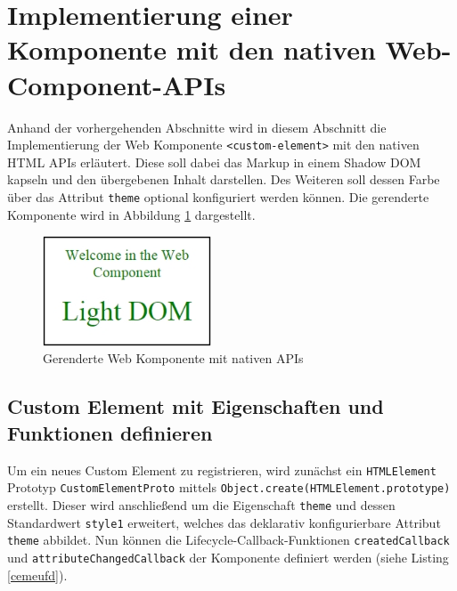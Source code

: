 \section{Implementierung einer Komponente mit den nativen Web-Component-APIs}\label{implementierung-einer-komponente-mit-den-nativen-web-component-apis}

Anhand der vorhergehenden Abschnitte wird in diesem Abschnitt die Implementierung der Web Komponente \texttt{\textless{}custom-element\textgreater{}} mit den nativen \ac{HTML} APIs erläutert. Diese soll dabei das Markup in einem Shadow \ac{DOM} kapseln und den übergebenen Inhalt darstellen. Des Weiteren soll dessen Farbe über das Attribut \texttt{theme} optional konfiguriert werden können. Die gerenderte Komponente wird in Abbildung \ref{fig:gwkmnapis} dargestellt.

\begin{figure}[htbp]
 \centering
 \includegraphics[width=5cm,keepaspectratio]{kapitel2/bilder/7-beispiel}
 \caption{Gerenderte Web Komponente mit nativen APIs}
 \label{fig:gwkmnapis}
\end{figure}


\subsection{Custom Element mit Eigenschaften und Funktionen definieren}\label{custom-element-mit-eigenschaften-und-funktionen-definieren}

Um ein neues Custom Element zu registrieren, wird zunächst ein \texttt{\ac{HTML}Element} Prototyp \texttt{CustomElementProto} mittels \texttt{Object.create(\ac{HTML}Element.prototype)} erstellt. Dieser wird anschließend um die Eigenschaft \texttt{theme} und dessen Standardwert \texttt{style1} erweitert, welches das deklarativ konfigurierbare
Attribut \texttt{theme} abbildet. Nun können die Lifecycle-Callback-Funktionen \texttt{createdCallback} und \texttt{attributeChangedCallback} der Komponente definiert werden (siehe Listing \ref{cemeufd}).



